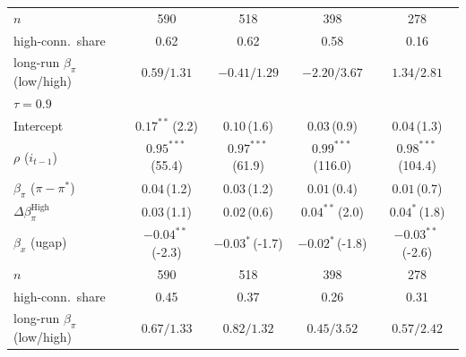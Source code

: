 \begin{tabular}{lcccc}
\addlinespace
$n$ & 590 & 518 & 398 & 278 \\
high-conn.\ share & 0.62 & 0.62 & 0.58 & 0.16 \\
long-run $\beta_\pi$ (low/high) & $0.59/1.31$ & $-0.41/1.29$ & $-2.20/3.67$ & $1.34/2.81$ \\
\midrule
\multicolumn{5}{l}{\textit{$\tau=0.9$}} \\
Intercept & $0.17^{**}$\,{\scriptsize(2.2)} & $0.10$\,{\scriptsize(1.6)} & $0.03$\,{\scriptsize(0.9)} & $0.04$\,{\scriptsize(1.3)} \\
$\rho$ ($i_{t-1}$) & $0.95^{***}$\,{\scriptsize(55.4)} & $0.97^{***}$\,{\scriptsize(61.9)} & $0.99^{***}$\,{\scriptsize(116.0)} & $0.98^{***}$\,{\scriptsize(104.4)} \\
$\beta_\pi$ ($\pi-\pi^*$) & $0.04$\,{\scriptsize(1.2)} & $0.03$\,{\scriptsize(1.2)} & $0.01$\,{\scriptsize(0.4)} & $0.01$\,{\scriptsize(0.7)} \\
$\Delta\beta_\pi^{\text{High}}$ & $0.03$\,{\scriptsize(1.1)} & $0.02$\,{\scriptsize(0.6)} & $0.04^{**}$\,{\scriptsize(2.0)} & $0.04^{*}$\,{\scriptsize(1.8)} \\
$\beta_x$ (ugap) & $-0.04^{**}$\,{\scriptsize(-2.3)} & $-0.03^{*}$\,{\scriptsize(-1.7)} & $-0.02^{*}$\,{\scriptsize(-1.8)} & $-0.03^{**}$\,{\scriptsize(-2.6)} \\
\addlinespace
$n$ & 590 & 518 & 398 & 278 \\
high-conn.\ share & 0.45 & 0.37 & 0.26 & 0.31 \\
long-run $\beta_\pi$ (low/high) & $0.67/1.33$ & $0.82/1.32$ & $0.45/3.52$ & $0.57/2.42$ \\
\bottomrule
\end{tabular}
